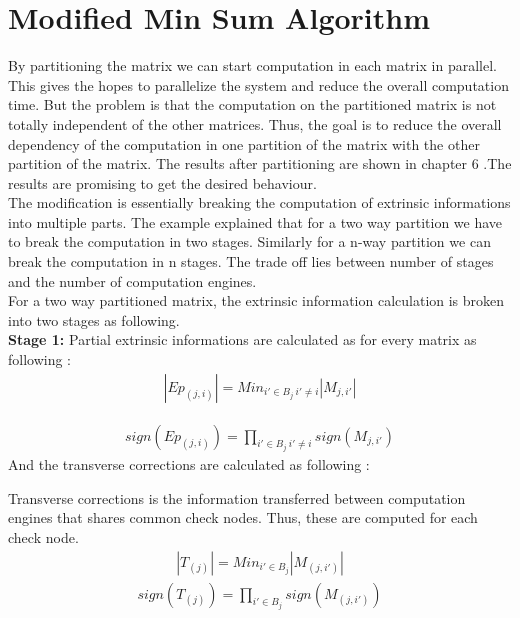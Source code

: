 \section{Modified Min Sum Algorithm }

By partitioning the matrix we can start computation in each matrix in parallel. This gives the hopes to parallelize the system and reduce the overall computation time. But the problem is that the computation on the partitioned matrix is not totally independent of the other matrices. Thus, the goal is to reduce the overall dependency of the computation in one partition of the matrix with the other partition of the matrix. The results after partitioning are shown in chapter 6 .The results are promising to get the desired behaviour. \\

The modification is essentially breaking the computation of extrinsic informations into multiple parts. The example explained that for a two way partition we have to break the computation in two stages. Similarly for a n-way partition we can break the computation in n stages. The trade off lies between number of stages and the number of computation engines. \\

For a two way partitioned matrix, the extrinsic information calculation is broken into two stages as following.
\\
\textbf{Stage 1:}
Partial extrinsic informations are calculated as for every matrix as following :
\begin{align}
|Ep_{(j,i)}| =  Min_{i'\in B_j \ i'\neq i }|M_{j,i'}|                                                                 
\end{align} 

\begin{align}
 sign({Ep_{(j,i)}}) =  \prod_{i'\in B_j \ i'\neq i }sign(M_{j,i'})  
\end{align} 
And the transverse corrections are calculated as following :

Transverse corrections is the information transferred between computation engines that shares common check nodes. Thus, these are computed for each check node. 
\begin{align} |T_{(j)}| =  Min_{i'\in B_j }|M_{(j,i')}|  
\end{align}  
\begin{align} sign({T_{(j)}}) =  \prod_{i'\in B_j}sign(M_{(j,i')})  
\end{align} 
 
